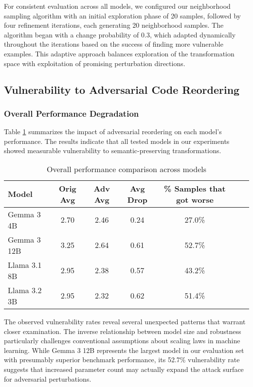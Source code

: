 \documentclass[%
thesis=student,%
coverpage=false,%
titlepage=false,%
headmarks=true, %
english,%
font=libertine, %
math=newpxtx, %
BCOR=5mm,%
coverBCOR=11mm%
]{tum-templates/book/tumbook}
\begin{document}
For consistent evaluation across all models, we configured our neighborhood sampling algorithm with an initial exploration phase of 20 samples, followed by four refinement iterations, each generating 20 neighborhood samples. The algorithm began with a change probability of 0.3, which adapted dynamically throughout the iterations based on the success of finding more vulnerable examples. This adaptive approach balances exploration of the transformation space with exploitation of promising perturbation directions.

\subsection{Vulnerability to Adversarial Code Reordering}

\subsubsection{Overall Performance Degradation}

Table \ref{tab:overall-performance} summarizes the impact of adversarial reordering on each model's performance. The results indicate that all tested models in our experiments showed measurable vulnerability to semantic-preserving transformations.

\begin{table}[h]
\centering
\caption{Overall performance comparison across models}
\label{tab:overall-performance}
\begin{tabular}{lcccccc}
\toprule
\textbf{Model} & \textbf{Orig Avg} & \textbf{Adv Avg} & \textbf{Avg Drop} & \textbf{\% Samples that got worse} \\
\midrule
Gemma 3 4B & 2.70 & 2.46 & 0.24 & 27.0\% \\
Gemma 3 12B & 3.25 & 2.64 & 0.61 & 52.7\% \\
Llama 3.1 8B & 2.95 & 2.38 & 0.57 & 43.2\% \\
Llama 3.2 3B & 2.95 & 2.32 & 0.62 & 51.4\% \\
\bottomrule
\end{tabular}
\end{table}

The observed vulnerability rates reveal several unexpected patterns that warrant closer examination. The inverse relationship between model size and robustness particularly challenges conventional assumptions about scaling laws in machine learning. While Gemma 3 12B represents the largest model in our evaluation set with presumably superior benchmark performance, its 52.7\% vulnerability rate suggests that increased parameter count may actually expand the attack surface for adversarial perturbations.
\end{document}
